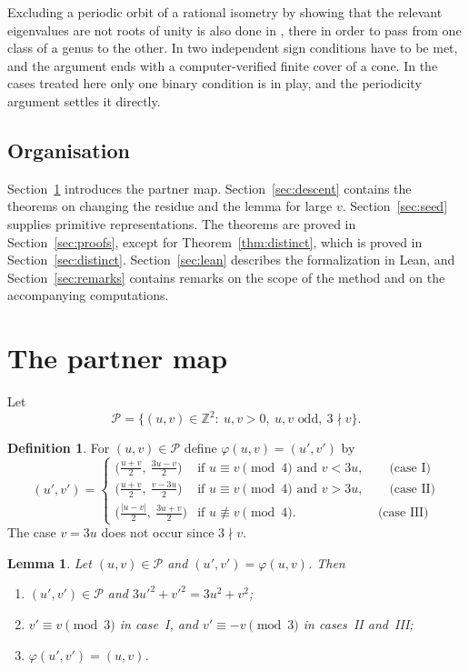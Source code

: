 \documentclass[11pt]{amsart}
\newtheorem{lemma}[theorem]{Lemma}
\theoremstyle{definition}
\newtheorem{definition}[theorem]{Definition}
\theoremstyle{remark}
\newcommand{\Z}{\mathbb{Z}}
\newcommand{\cP}{\mathcal{P}}
\begin{document}
Excluding a periodic orbit of a rational isometry by showing that the relevant eigenvalues are not roots of unity
is also done in \cite[Lemma~6]{CGQFG}, there in order to pass from one class of a genus to the other.
In \cite{CGQFG} two independent sign conditions have to be met, and the argument ends with a computer-verified finite cover of a cone.
In the cases treated here only one binary condition is in play, and the periodicity argument settles it directly.

\subsection*{Organisation}
Section~\ref{sec:partner} introduces the partner map.
Section~\ref{sec:descent} contains the theorems on changing the residue and the lemma for large $v$.
Section~\ref{sec:seed} supplies primitive representations.
The theorems are proved in Section~\ref{sec:proofs}, except for Theorem~\ref{thm:distinct}, which is proved in Section~\ref{sec:distinct}.
Section~\ref{sec:lean} describes the formalization in Lean,
and Section~\ref{sec:remarks} contains remarks on the scope of the method and on the accompanying computations.

\section{The partner map}\label{sec:partner}

Let
\[
\cP=\{(u,v)\in\Z^2:\ u,v>0,\ u,v \text{ odd},\ 3\nmid v\}.
\]

\begin{definition}\label{def:partner}
For $(u,v)\in\cP$ define $\varphi(u,v)=(u',v')$ by
\[
(u',v')=
\begin{cases}
\bigl(\tfrac{u+v}{2},\ \tfrac{3u-v}{2}\bigr) & \text{if } u\equiv v\pmod 4 \text{ and } v<3u,\qquad \text{(case I)}\\[4pt]
\bigl(\tfrac{u+v}{2},\ \tfrac{v-3u}{2}\bigr) & \text{if } u\equiv v\pmod 4 \text{ and } v>3u,\qquad \text{(case II)}\\[4pt]
\bigl(\tfrac{|u-v|}{2},\ \tfrac{3u+v}{2}\bigr) & \text{if } u\not\equiv v\pmod 4.\qquad\qquad\qquad\ \ \text{(case III)}
\end{cases}
\]
The case $v=3u$ does not occur since $3\nmid v$.
\end{definition}

\begin{lemma}\label{lem:partner}
Let $(u,v)\in\cP$ and $(u',v')=\varphi(u,v)$. Then
\begin{enumerate}
\item[(a)] $(u',v')\in\cP$ and $3u'^2+v'^2=3u^2+v^2$;
\item[(b)] $v'\equiv v\pmod 3$ in case~I, and $v'\equiv -v\pmod 3$ in cases~II and~III;
\item[(c)] $\varphi(u',v')=(u,v)$.
\end{enumerate}
\end{lemma}
\end{document}
